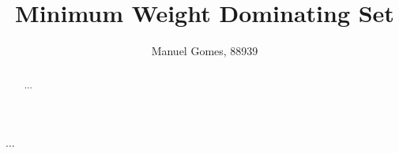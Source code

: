 \documentclass[shortpaper,english]{revdetua}
\begin{document}

\title{Minimum Weight Dominating Set}
\author{Manuel Gomes, 88939} %
\maketitle

\begin{abstract}%
  ...
\end{abstract}

\begin{resumo}%
  ...
\end{resumo}











\end{document}
